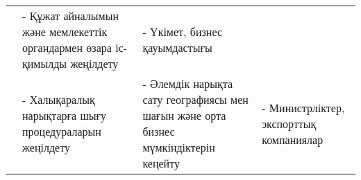 \begin{table}[H]
\begin{tabular}{|p{}|p{}|p{}|p{}|}
        & \begin{minipage}{0.3\textwidth} - Құжат айналымын және мемлекеттік органдармен өзара іс-қимылды жеңілдету \end{minipage} 
        & \begin{minipage}{0.2\textwidth} - Үкімет, бизнес қауымдастығы \end{minipage} \\ 
        \cline{2-4}  
        & \begin{minipage}{0.2\textwidth} - Халықаралық нарықтарға шығу процедураларын жеңілдету \end{minipage} 
        & \begin{minipage}{0.3\textwidth} - Әлемдік нарықта сату географиясы мен шағын және орта бизнес мүмкіндіктерін кеңейту \end{minipage} 
        & \begin{minipage}{0.2\textwidth} - Министрліктер, экспорттық компаниялар \end{minipage} \\ 
        \hline
    \end{tabular}
\end{table}

